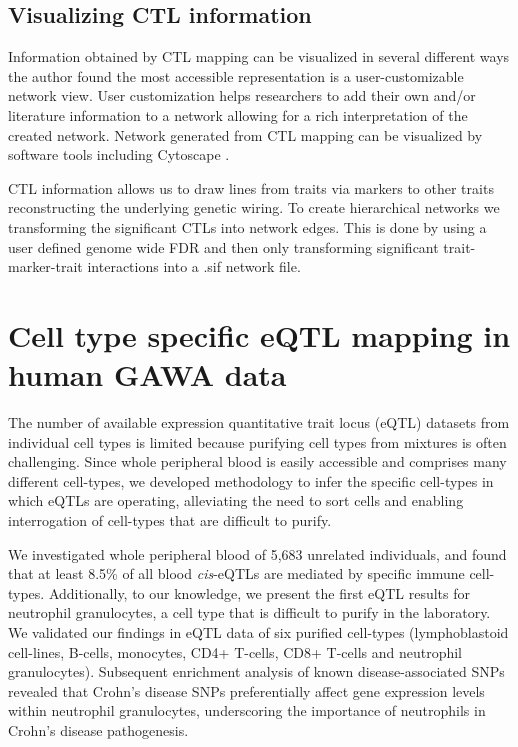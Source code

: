   \subsection{Visualizing CTL information}
  Information obtained by CTL mapping can be visualized in several different ways the author found the most accessible 
  representation is a user-customizable network view. User customization helps researchers to add their own and/or 
  literature information to a network allowing for a rich interpretation of the created network. Network generated from 
  CTL mapping can be visualized by software tools including Cytoscape \cite{Cytoscape:2010, Cytoscape:2003}.

  CTL information allows us to draw lines from traits via markers to other traits reconstructing the underlying genetic 
  wiring. To create hierarchical networks we transforming the significant CTLs into network edges. This is done by 
  using a user defined genome wide FDR and then only transforming significant trait-marker-trait interactions into a 
  .sif network file.

\section{Cell type specific eQTL mapping in human GAWA data}
\label{sec:cellspecificeqtl}
  The number of available expression quantitative trait locus (eQTL) datasets from individual cell 
  types is limited because purifying cell types from mixtures is often challenging.  Since whole 
  peripheral blood is easily accessible and comprises many different cell-types, we developed 
  methodology to infer the specific cell-types in which eQTLs are operating,  alleviating the need 
  to sort cells and enabling interrogation of cell-types that are difficult to purify.

  We investigated whole peripheral blood of 5,683 unrelated individuals, and found that at least 
  8.5\% of all blood \emph{cis}-eQTLs are mediated by specific immune cell-types. Additionally, to our 
  knowledge, we present the first eQTL results for neutrophil granulocytes, a cell type that is 
  difficult to purify in the laboratory. We validated our findings in eQTL data of six purified 
  cell-types (lymphoblastoid cell-lines, B-cells, monocytes, CD4+ T-cells, CD8+ T-cells and 
  neutrophil granulocytes). Subsequent enrichment analysis of known disease-associated SNPs 
  revealed that Crohn's disease SNPs preferentially affect gene expression levels within neutrophil 
  granulocytes, underscoring the importance of neutrophils in Crohn's disease pathogenesis.

